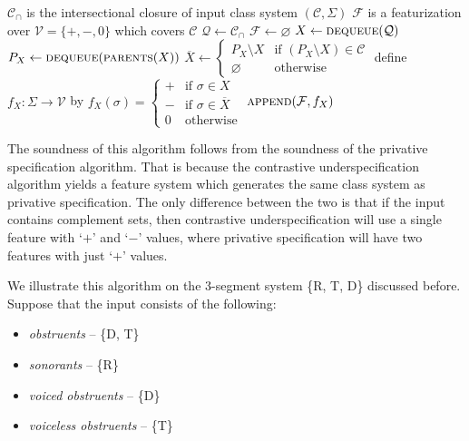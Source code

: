 \documentclass[11pt, oneside]{article}   	%
\begin{document}
\vspace{\baselineskip} \noindent \begin{algorithmic}
    \REQUIRE $\mathcal C_\cap$ is the intersectional closure of input class system $(\mathcal C, \Sigma)$
    \ENSURE $\mathcal F$ is a featurization over $\mathcal V = \{ +, -, 0 \}$ which covers $\mathcal C$
    \STATE
    \STATE $\mathcal Q \leftarrow \mathcal C_\cap$
    \STATE $\mathcal F \leftarrow \varnothing$
    \STATE
        \STATE $X \leftarrow \textsc{dequeue}(\mathcal Q)$
            \STATE $P_X \leftarrow \textsc{dequeue}(\textsc{parents}(X))$
            \STATE
            \STATE $\overline{X} \leftarrow \begin{cases}
                P_X \setminus X & \text{if } (P_X \setminus X) \in \mathcal C \\
                \varnothing     & \text{otherwise}
                \end{cases}$
            \STATE
            \STATE define $f_X : \Sigma \rightarrow \mathcal V$ by $f_X (\sigma) = \begin{cases}
                    + & \text{if } \sigma \in X \\
                    - & \text{if } \sigma \in \overline{X} \\
                    0 & \text{otherwise}
                    \end{cases}$
            \STATE $\textsc{append}(\mathcal F, f_X)$
        \ENDIF
    \ENDWHILE
\end{algorithmic}

\vspace{\baselineskip} \noindent The soundness of this algorithm follows from the soundness of the privative specification algorithm. That is because the contrastive underspecification algorithm yields a feature system which generates the same class system as privative specification. The only difference between the two is that if the input contains complement sets, then contrastive underspecification will use a single feature with `$+$' and `$-$' values, where privative specification will have two features with just `$+$' values.

\vspace{\baselineskip} We illustrate this algorithm on the 3-segment system \{R, T, D\} discussed before. Suppose that the input consists of the following: \begin{itemize}
    \item \textit{obstruents} -- \{D, T\}
    \item \textit{sonorants} -- \{R\}
    \item \textit{voiced obstruents} -- \{D\}
    \item \textit{voiceless obstruents} -- \{T\}
    \end{itemize}
\end{document}
